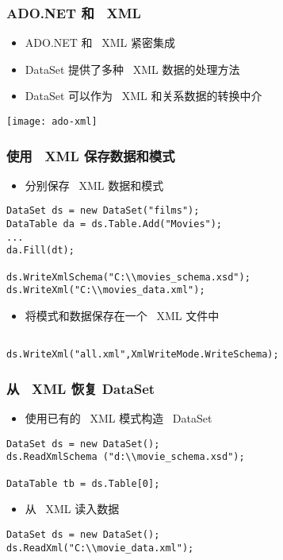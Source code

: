 \begin{frame}
\frametitle{ADO.NET 和 ~XML}
\begin{itemize}
\item ADO.NET 和 ~XML 紧密集成
\item DataSet 提供了多种 ~XML 数据的处理方法
\item DataSet 可以作为 ~XML 和关系数据的转换中介
\end{itemize}
\begin{center}
  \texttt{[image: ado-xml]}
\end{center}
\end{frame}

\begin{frame}[fragile]
\frametitle{使用 ~XML 保存数据和模式}
\begin{itemize}
\item 分别保存 ~XML 数据和模式
\end{itemize}
\begin{lstlisting}
DataSet ds = new DataSet("films");
DataTable da = ds.Table.Add("Movies");
...
da.Fill(dt);

ds.WriteXmlSchema("C:\\movies_schema.xsd");
ds.WriteXml("C:\\movies_data.xml");

\end{lstlisting}
\begin{itemize}
\item 将模式和数据保存在一个 ~XML 文件中
\end{itemize}
\begin{lstlisting}

ds.WriteXml("all.xml",XmlWriteMode.WriteSchema);

\end{lstlisting}
\end{frame}

\begin{frame}[fragile]
\frametitle{从 ~XML 恢复 DataSet}
\begin{itemize}
\item 使用已有的 ~XML 模式构造 ~DataSet
\end{itemize}
\begin{lstlisting}
DataSet ds = new DataSet();
ds.ReadXmlSchema ("d:\\movie_schema.xsd");

DataTable tb = ds.Table[0];
\end{lstlisting}
\begin{itemize}
\item 从 ~XML 读入数据
\end{itemize}
\begin{lstlisting}
DataSet ds = new DataSet();
ds.ReadXml("C:\\movie_data.xml");

\end{lstlisting}
\end{frame}

